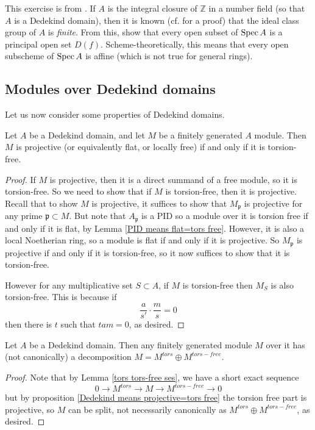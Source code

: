 \begin{exercise} 
This exercise is from \cite{Li02}. If $A$ is the integral closure of
$\mathbb{Z}$ in a number field (so that $A$ is a Dedekind domain), then it is
known (cf. \cite{La94} for a proof) that the ideal class group of $A$ is
\emph{finite}. From this, show that every open subset of $\operatorname{Spec} A$ is a
principal open set $D(f)$. Scheme-theoretically, this means that every open
subscheme of $\operatorname{Spec} A$ is affine (which is not true for general rings).
\end{exercise} 

\subsection{Modules over Dedekind domains}

Let us now consider some properties of Dedekind domains.

\begin{proposition} Let $A$ be a Dedekind domain, and let $M$ be a finitely generated $A$ module. Then
$M$ is projective (or equivalently flat, or locally free) if and only if it is torsion-free.
\label{Dedekind means projective=tors free}
\end{proposition}
\begin{proof}
If $M$ is projective, then it is a direct summand of a free module, so it is torsion-free. So we need to show that if $M$ is torsion-free, then it is projective. Recall that to show $M$ is projective, it suffices to show that $M_\mathfrak{p}$ is projective for any prime $\mathfrak{p} \subset M$. But note that $A_\mathfrak{p}$ is a PID so a module over it is torsion free if and only if it is flat, by Lemma \ref{PID means flat=tors free}. However, it is also a local Noetherian ring, so a module is flat if and only if it is projective. So $M_\mathfrak{p}$ is projective if and only if it is torsion-free, so it now suffices to show that it is torsion-free.

However for any multiplicative set $S \subset A$, if $M$ is torsion-free then $M_S$ is also torsion-free. This is because if
\[\frac{a}{s'} \cdot \frac{m}{s}=0\]
then there is $t$ such that $tam=0$,
as desired.
\end{proof}

\begin{proposition}
Let $A$ be a Dedekind domain. Then any finitely generated module $M$ over it has (not canonically) a decomposition $M=M^{tors} \oplus M^{tors-free}$.
\end{proposition}
\begin{proof}
Note that by Lemma \ref{tors tors-free ses}, we have a short exact sequence
\[ 0 \to M^{tors} \to M \to M^{tors-free} \to 0\]
but by proposition \ref{Dedekind means projective=tors free} the torsion free part is projective, so $M$ can be split, not necessarily canonically as  $M^{tors} \oplus M^{tors-free}$, as desired.
\end{proof}

